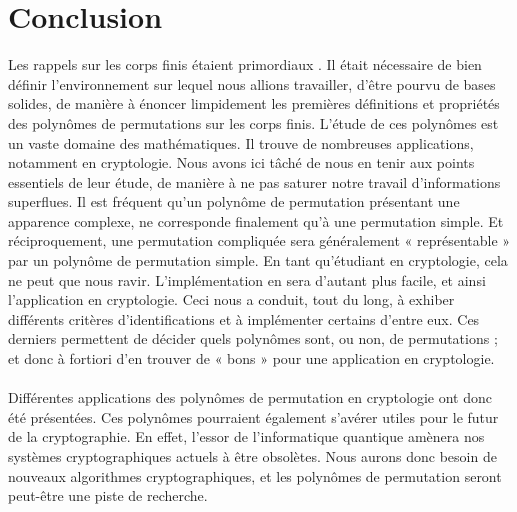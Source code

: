 \documentclass[12pt]{article}
\theoremstyle{remark}\newtheorem{note}{Note}
\theoremstyle{remark}\newtheorem{nota}{Notation}
\theoremstyle{definition}
\begin{document}
\section*{Conclusion}

Les rappels sur les corps finis étaient primordiaux . Il était nécessaire de bien définir l'environnement sur lequel nous allions travailler, d’être pourvu de bases solides, de manière à énoncer limpidement les premières définitions et propriétés des polynômes de permutations sur les corps finis. L'étude de ces polynômes est un vaste domaine des mathématiques. Il trouve de nombreuses applications, notamment en cryptologie. Nous avons ici tâché de nous en tenir aux points essentiels de leur étude, de manière à ne pas saturer notre travail d’informations superflues. \newline
\break
Il est fréquent qu'un polynôme de permutation présentant une apparence complexe, ne corresponde finalement qu’à une permutation simple. Et réciproquement, une permutation compliquée sera généralement « représentable » par un polynôme de permutation simple. En tant qu’étudiant en cryptologie, cela ne peut que nous ravir. L’implémentation en sera d’autant plus facile, et ainsi l’application en cryptologie. \newline
Ceci nous a conduit, tout du long, à exhiber différents critères d’identifications et à implémenter certains d’entre eux. Ces derniers permettent de décider quels polynômes sont, ou non, de permutations ; et donc à fortiori d'en trouver de « bons » pour une application en cryptologie.\\\\
Différentes applications des polynômes de permutation en cryptologie ont donc été présentées. Ces polynômes pourraient également s'avérer utiles pour le futur de la cryptographie. En effet, l'essor de l'informatique quantique amènera nos systèmes cryptographiques actuels à être obsolètes. Nous aurons donc besoin de nouveaux algorithmes cryptographiques, et les polynômes de permutation seront peut-être une piste de recherche.


\pagebreak



\end{document}

